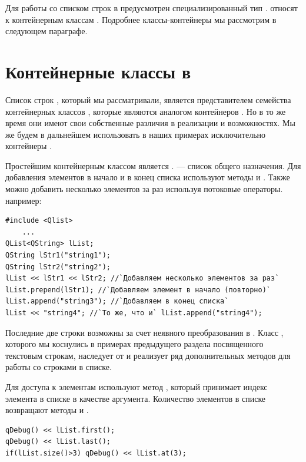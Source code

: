 Для работы со списком строк в  предусмотрен специализированный тип
.   относят к контейнерным классам .
Подробнее классы-контейнеры мы рассмотрим в следующем параграфе.

\section[Контейнерные классы в \Sys{Qt}]{Контейнерные классы в }

Список строк , который мы рассматривали, является представителем
семейства контейнерных классов , которые являются
аналогом контейнеров . Но в то же время они имеют свои собственные различия в 
реализации и возможностях. Мы же будем
в дальнейшем использовать в наших примерах исключительно контейнеры .

Простейшим контейнерным классом является . 
 --- список общего назначения. Для добавления элементов в начало и в конец списка используют методы
 и . Также можно добавить несколько элементов за раз
используя потоковые операторы. например:
\begin{lstlisting}
#include <Qlist>
    ...
QList<QString> lList;
QString lStr1("string1");
QString lStr2("string2");
lList << lStr1 << lStr2; //`Добавляем несколько элементов за раз`
lList.prepend(lStr1); //`Добавляем элемент в начало (повторно)` 
lList.append("string3"); //`Добавляем в конец списка`
lList << "string4";	//`То же, что и` lList.append("string4");
\end{lstlisting}

Последние две строки возможны за счет неявного преобразования  в
. Класс , которого мы коснулись в примерах
предыдущего раздела посвященного текстовым строкам, наследует от 
и реализует ряд дополнительных методов для работы со строками в списке.

Для доступа к элементам используют метод , который принимает индекс элемента в
списке в качестве аргумента. Количество элементов в списке возвращают методы  и
.
\begin{lstlisting}
qDebug() << lList.first();
qDebug() << lList.last();
if(lList.size()>3) qDebug() << lList.at(3);
\end{lstlisting}

